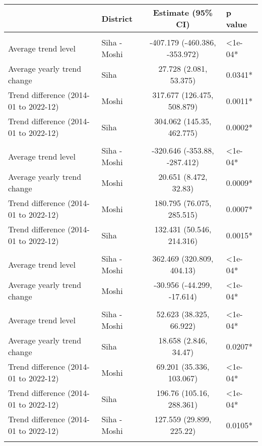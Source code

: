 \begin{longtable}{l|lcl}
\toprule
\multicolumn{1}{l}{} & District & Estimate (95\% CI) & p value \\ 
\midrule\addlinespace[2.5pt]
\multicolumn{4}{l}{Cardiovascular Diseases} \\ 
\midrule\addlinespace[2.5pt]
Average trend level & Siha - Moshi & -407.179 (-460.386, -353.972) & <1e-04* \\ 
Average yearly trend change & Siha & 27.728 (2.081, 53.375) & 0.0341* \\ 
Trend difference (2014-01 to 2022-12) & Moshi & 317.677 (126.475, 508.879) & 0.0011* \\ 
Trend difference (2014-01 to 2022-12) & Siha & 304.062 (145.35, 462.775) & 0.0002* \\ 
\midrule\addlinespace[2.5pt]
\multicolumn{4}{l}{Diabetes Mellitus} \\ 
\midrule\addlinespace[2.5pt]
Average trend level & Siha - Moshi & -320.646 (-353.88, -287.412) & <1e-04* \\ 
Average yearly trend change & Moshi & 20.651 (8.472, 32.83) & 0.0009* \\ 
Trend difference (2014-01 to 2022-12) & Moshi & 180.795 (76.075, 285.515) & 0.0007* \\ 
Trend difference (2014-01 to 2022-12) & Siha & 132.431 (50.546, 214.316) & 0.0015* \\ 
\midrule\addlinespace[2.5pt]
\multicolumn{4}{l}{Gastrointestinal Infections} \\ 
\midrule\addlinespace[2.5pt]
Average trend level & Siha - Moshi & 362.469 (320.809, 404.13) & <1e-04* \\ 
Average yearly trend change & Moshi & -30.956 (-44.299, -17.614) & <1e-04* \\ 
\midrule\addlinespace[2.5pt]
\multicolumn{4}{l}{Infectious Eye Disease} \\ 
\midrule\addlinespace[2.5pt]
Average trend level & Siha - Moshi & 52.623 (38.325, 66.922) & <1e-04* \\ 
Average yearly trend change & Siha & 18.658 (2.846, 34.47) & 0.0207* \\ 
Trend difference (2014-01 to 2022-12) & Moshi & 69.201 (35.336, 103.067) & <1e-04* \\ 
Trend difference (2014-01 to 2022-12) & Siha & 196.76 (105.16, 288.361) & <1e-04* \\ 
Trend difference (2014-01 to 2022-12) & Siha - Moshi & 127.559 (29.899, 225.22) & 0.0105* \\ 
\midrule\addlinespace[2.5pt]

\end{longtable}
